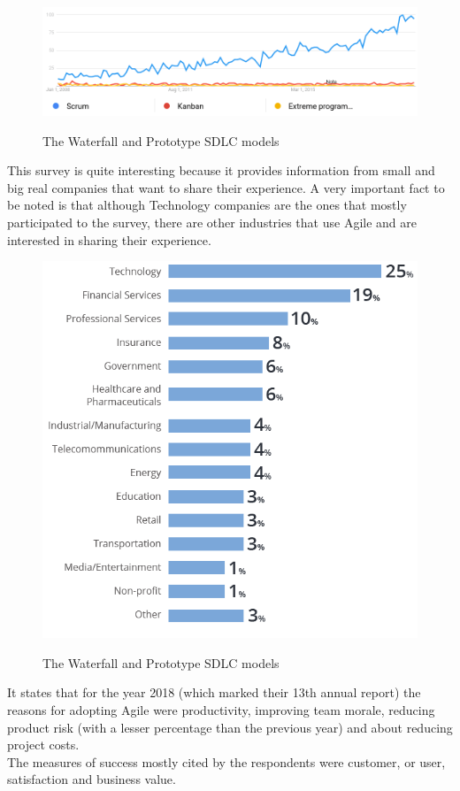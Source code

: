 	\begin{figure}[H]
		\centering
		\includegraphics[width=\textwidth]{resources/trends}\\
		\caption{The Waterfall and Prototype SDLC models}
	\end{figure}
	This survey is quite interesting because it provides information from small and big real companies that want to share their experience.
	A very important fact to be noted is that although Technology companies are the ones that mostly participated to the survey, there are other industries that use Agile and are interested in sharing their experience.
	\begin{figure}[H]
		\centering
		\includegraphics[width=.8\textwidth]{resources/Untitled_2}\\
		\caption{The Waterfall and Prototype SDLC models}
	\end{figure}
	It states that for the year 2018 (which marked their 13th annual report) the reasons for adopting Agile were productivity, improving team morale, reducing product risk (with a lesser percentage than the previous year) and about reducing project costs.\\
	The measures of success mostly cited by the respondents were customer, or user, satisfaction and business value.\\

